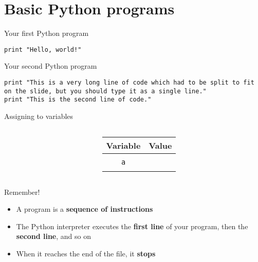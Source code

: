\newcommand{\socrative}{
	\begin{center}
		Socrative room code: \texttt{FALCOMPED}
	\end{center}
}

\newcommand{\codeslide}[2]{
	\begin{columns}
		\begin{column}{0.48\textwidth}
			
		\end{column}
		\pause
		\begin{column}{0.48\textwidth}
			\begin{center}
				\begin{tabular}{|c|c|}
					\hline
					\textbf{Variable} & \textbf{Value} \\\hline
					#2
				\end{tabular}
			\end{center}
		\end{column}
	\end{columns}
}

\newcommand{\trow}[1]{ & \\ \texttt{#1} & \\ & \\\hline}

\part{Basic Python programs}
\frame{\partpage}

\begin{frame}[fragile]{Your first Python program}
	\begin{lstlisting}
print "Hello, world!"
	\end{lstlisting}
\end{frame}

\begin{frame}[fragile]{Your second Python program}
	\begin{lstlisting}
print "This is a very long line of code which had to be split to fit on the slide, but you should type it as a single line."
print "This is the second line of code."
	\end{lstlisting}
\end{frame}

\begin{frame}[fragile]{Assigning to variables}
	\codeslide{assign0.py}{\trow{a}}
\end{frame}

\begin{frame}{Remember!}
	\begin{itemize}
		\pause\item A program is a \textbf{sequence of instructions}
		\pause\item The Python interpreter executes the \textbf{first line} of your program, then the \textbf{second line},
			and so on
		\pause\item When it reaches the end of the file, it \textbf{stops}
	\end{itemize}
\end{frame}

